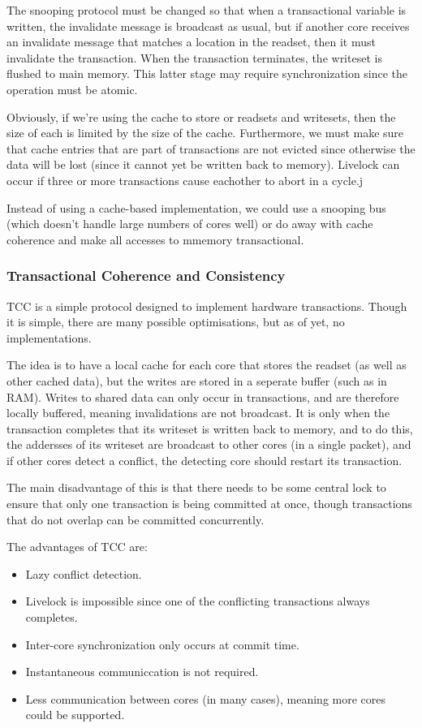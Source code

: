 The snooping protocol must be changed so that when a transactional
variable is written, the invalidate message is broadcast as usual, but
if another core receives an invalidate message that matches a location
in the readset, then it must invalidate the transaction. When the
transaction terminates, the writeset is flushed to main memory. This
latter stage may require synchronization since the operation must be
atomic.

Obviously, if we're using the cache to store or readsets and
writesets, then the size of each is limited by the size of the
cache. Furthermore, we must make sure that cache entries that are part
of transactions are not evicted since otherwise the data will be lost
(since it cannot yet be written back to memory). Livelock can occur if
three or more transactions cause eachother to abort in a cycle.j

Instead of using a cache-based implementation, we could use a snooping
bus (which doesn't handle large numbers of cores well) or do away with
cache coherence and make all accesses to mmemory transactional.

\subsubsection{Transactional Coherence and Consistency}

TCC is a simple protocol designed to implement hardware
transactions. Though it is simple, there are many possible
optimisations, but as of yet, no implementations.

The idea is to have a local cache for each core that stores the
readset (as well as other cached data), but the writes are stored in a
seperate buffer (such as in RAM). Writes to shared data can only occur
in transactions, and are therefore locally buffered, meaning
invalidations are not broadcast. It is only when the transaction
completes that its writeset is written back to memory, and to do this,
the addersses of its writeset are broadcast to other cores (in a
single packet), and if other cores detect a conflict, the detecting
core should restart its transaction.

The main disadvantage of this is that there needs to be some central
lock to ensure that only one transaction is being committed at once,
though transactions that do not overlap can be committed concurrently.

The advantages of TCC are:

\begin{itemize}
\item Lazy conflict detection.
\item Livelock is impossible since one of the conflicting transactions always completes.
\item Inter-core synchronization only occurs at commit time.
\item Instantaneous communiccation is not required.
\item Less communication between cores (in many cases), meaning more cores could be supported.
\end{itemize}

